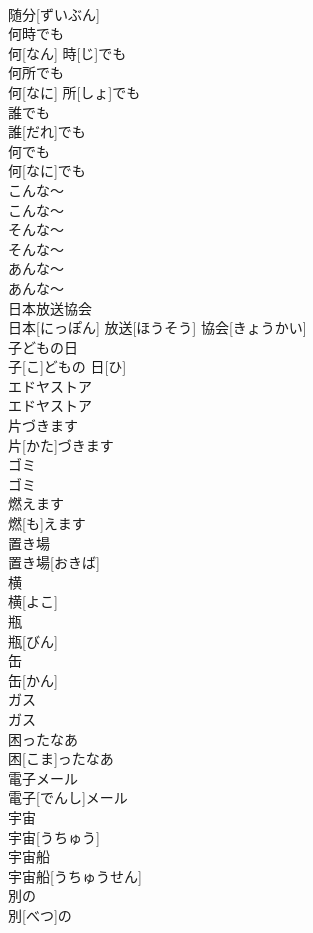 \documentclass[8pt]{extreport}
\begin{document}
\begin{CJK}{UTF8}{min}
\\	随分[ずいぶん]	
\\	何時でも	
\\	何[なん] 時[じ]でも	
\\	何所でも	
\\	何[なに] 所[しょ]でも	
\\	誰でも	
\\	誰[だれ]でも	
\\	何でも	
\\	何[なに]でも	
\\	こんな〜	
\\	こんな〜	
\\	そんな〜	
\\	そんな〜	
\\	あんな〜	
\\	あんな〜	
\\	日本放送協会	
\\	日本[にっぽん] 放送[ほうそう] 協会[きょうかい]	
\\	子どもの日	
\\	子[こ]どもの 日[ひ]	
\\	エドヤストア	
\\	エドヤストア	
\\	片づきます	
\\	片[かた]づきます	
\\	ゴミ	
\\	ゴミ	
\\	燃えます	
\\	燃[も]えます	
\\	置き場	
\\	置き場[おきば]	
\\	横	
\\	横[よこ]	
\\	瓶	
\\	瓶[びん]	
\\	缶	
\\	缶[かん]	
\\	ガス	
\\	ガス	
\\	困ったなあ	
\\	困[こま]ったなあ	
\\	電子メール	
\\	電子[でんし]メール	
\\	宇宙	
\\	宇宙[うちゅう]	
\\	宇宙船	
\\	宇宙船[うちゅうせん]	
\\	別の	
\\	別[べつ]の	

\end{CJK}
\end{document}
